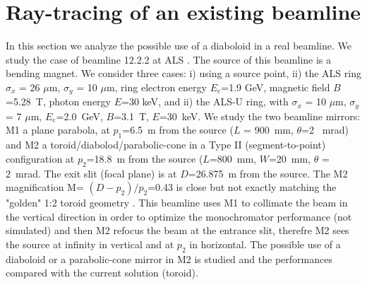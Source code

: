 \documentclass{iucr}              %
\begin{document}
\section{Ray-tracing of an existing beamline}
\label{sec:beamline}

In this section we analyze the possible use of a diaboloid in a real beamline. We study the case of beamline 12.2.2  at ALS \cite{bl1222} \cite{MacDowell2004}. The source of this beamline is a bending magnet. We consider three cases: i) using a source point, ii) the ALS ring
$\sigma_x$ = 26 $\mu$m, $\sigma_y$ = 10 $\mu$m, ring electron energy $E_e$=1.9 GeV, magnetic field $B$=5.28~T, photon energy $E$=30 keV, and ii) the ALS-U ring, with $\sigma_x$ = 10 $\mu$m, $\sigma_y$ = 7 $\mu$m, $E_e$=2.0~GeV, $B$=3.1~T, $E$=30~keV. We study the two beamline mirrors: M1 a plane parabola, at $p_1$=6.5~m from the source ($L$ = 900~mm, $\theta$=2 ~mrad) and M2 a toroid/diabolod/parabolic-cone in a Type II (segment-to-point) configuration at $p_2$=18.8~m from the source ($L$=800~mm, $W$=20~mm, $\theta$ = 2~mrad. The exit slit (focal plane) is at $D$=26.875~m from the source.  The M2 magnification M= $(D-p_2)/p_2$=0.43 is close but not exactly matching the "golden" 1:2 toroid geometry \cite{padmore2000, howells2000}. This beamline uses M1 to collimate the beam in the vertical direction in order to optimize the monochromator performance (not simulated) and then M2 refocus the beam at the entrance slit, therefre M2 sees the source at infinity in vertical and at $p_2$ in horizontal. The possible use of a diaboloid or a parabolic-cone mirror in M2 is studied and the performances compared with the current solution (toroid).
\end{document}
